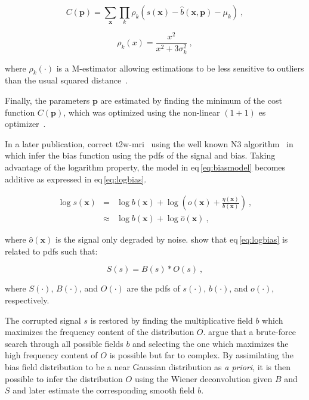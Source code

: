 \begin{equation}
	C(\mathbf{p}) = \sum_{\mathbf{x}} \prod_{k} \rho_k(s(\mathbf{x}) - \hat{b}(\mathbf{x},\mathbf{p}) - \mu_k) \ ,
	\label{eq:costbias}
\end{equation}

\begin{equation}
	\rho_k(x) = \frac{x^2}{x^2 + 3 \sigma_k^2} \ ,
	\label{eq:mestbias}
\end{equation}

\noindent where $\rho_k(\cdot)$ is a M-estimator allowing estimations to be less sensitive to outliers than the usual squared distance~\cite{Li1996}.

Finally, the parameters $\mathbf{p}$ are estimated by finding the minimum of the cost function $C(\mathbf{p})$, which was optimized using the non-linear $(1+1)$ \ac{es} optimizer~\cite{Styner1997}.

In a later publication, \citeauthor{Viswanath2012} correct \ac{t2w}-\ac{mri}~\cite{Viswanath2012} using the well known N3 algorithm~\cite{Sled1998} in which \citeauthor{Sled1998} infer the bias function using the \acp{pdf} of the signal and bias.
Taking advantage of the logarithm property, the model in \acs{eq}\,\eqref{eq:biasmodel} becomes additive as expressed in \acs{eq}\,\eqref{eq:logbias}.

\begin{eqnarray}
	\log s(\mathbf{x}) & = & \log b(\mathbf{x}) + \log \left( o(\mathbf{x}) + \frac{\eta(\mathbf{x})}{b(\mathbf{x})} \right) \ , \nonumber \\
	& \approx & \log b(\mathbf{x}) + \log \hat{o}(\mathbf{x}) \ , \label{eq:logbias}
\end{eqnarray}

\noindent where $\hat{o}(\mathbf{x})$ is the signal only degraded by noise. \citeauthor{Sled1998} show that \acs{eq}\,\eqref{eq:logbias} is related to \acp{pdf} such that:

\begin{equation}
	S(s) = B(s) * O(s) \ ,
	\label{eq:distrbias} 
\end{equation}

\noindent where $S(\cdot)$, $B(\cdot)$, and $O(\cdot)$ are the \acp{pdf} of $s(\cdot)$, $b(\cdot)$, and $o(\cdot)$, respectively.

The corrupted signal $s$ is restored by finding the multiplicative field $b$ which maximizes the frequency content of the distribution $O$.
\citeauthor{Sled1998} argue that a brute-force search through all possible fields $b$ and selecting the one which maximizes the high frequency content of $O$ is possible but far to complex.
By assimilating the bias field distribution to be a near Gaussian distribution as \textit{a priori}, it is then possible to infer the distribution $O$ using the Wiener deconvolution given $B$ and $S$ and later estimate the corresponding smooth field $b$.

